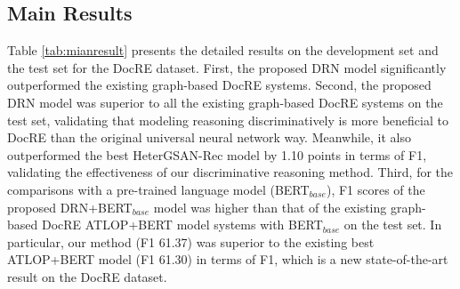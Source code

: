 \documentclass[11pt,a4paper]{article}
\begin{document}
\subsection{Main Results}
\label{sec4-3}
Table \ref{tab:mianresult} presents the detailed results on the development set and the test set for the DocRE dataset. 
First, the proposed DRN model significantly outperformed the existing graph-based DocRE systems. 
Second, the proposed DRN model was superior to all the existing graph-based DocRE systems on the test set, validating that modeling reasoning discriminatively is more beneficial to DocRE than the original universal neural network way.
Meanwhile, it also outperformed the best HeterGSAN-Rec model by 1.10 points in terms of F1, validating the effectiveness of our discriminative reasoning method.
Third, for the comparisons with a pre-trained language model (BERT$_{base}$), F1 scores of the proposed DRN+BERT$_{base}$ model was higher than that of the existing graph-based DocRE ATLOP+BERT model systems with BERT$_{base}$ on the test set.
In particular, our method (F1 61.37) was superior to the existing best ATLOP+BERT model (F1 61.30) in terms of F1, which is a new state-of-the-art result on the DocRE dataset.
\end{document}
